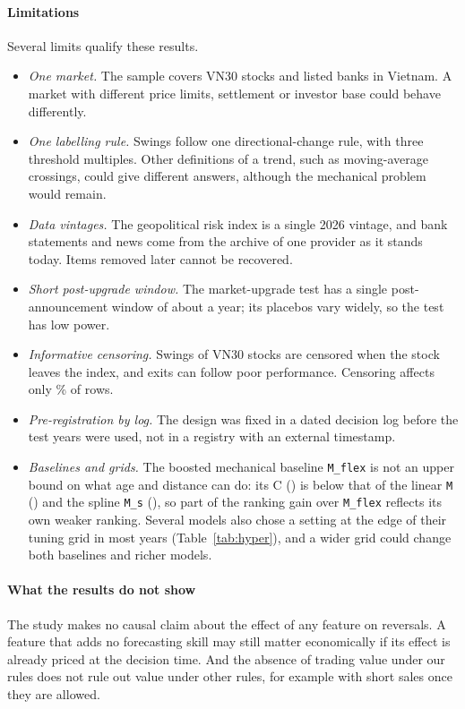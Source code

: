 \paragraph{Limitations} Several limits qualify these results.
\begin{itemize}
\item \emph{One market.} The sample covers VN30 stocks and listed banks in Vietnam. A market with
  different price limits, settlement or investor base could behave differently.
\item \emph{One labelling rule.} Swings follow one directional-change rule, with three threshold
  multiples. Other definitions of a trend, such as moving-average crossings, could give different
  answers, although the mechanical problem would remain.
\item \emph{Data vintages.} The geopolitical risk index is a single 2026 vintage, and bank statements
  and news come from the archive of one provider as it stands today. Items removed later cannot be
  recovered.
\item \emph{Short post-upgrade window.} The market-upgrade test has a single post-announcement window
  of about a year; its placebos vary widely, so the test has low power.
\item \emph{Informative censoring.} Swings of VN30 stocks are censored when the stock leaves the
  index, and exits can follow poor performance. Censoring affects only \CensoredPct\% of rows.
\item \emph{Pre-registration by log.} The design was fixed in a dated decision log before the test
  years were used, not in a registry with an external timestamp.
\item \emph{Baselines and grids.} The boosted mechanical baseline \texttt{M\_flex} is not an upper
  bound on what age and distance can do: its C (\CMFlex) is below that of the linear \texttt{M}
  (\CM) and the spline \texttt{M\_s} (\CMS), so part of the ranking gain over \texttt{M\_flex}
  reflects its own weaker ranking. Several models also chose a setting at the edge of their tuning
  grid in most years (Table~\ref{tab:hyper}), and a wider grid could change both baselines and
  richer models.
\end{itemize}

\paragraph{What the results do not show} The study makes no causal claim about the effect of any
feature on reversals. A feature that adds no forecasting skill may still matter economically if its
effect is already priced at the decision time. And the absence of trading value under our rules
does not rule out value under other rules, for example with short sales once they are allowed.
